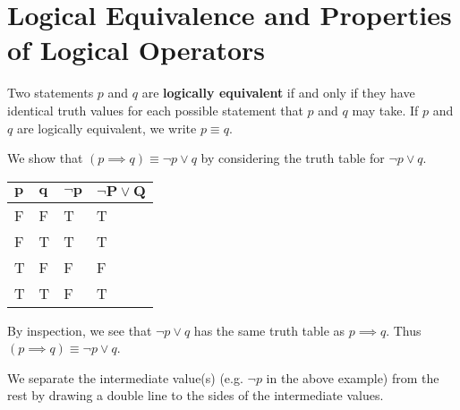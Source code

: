 \section{Logical Equivalence and Properties of Logical Operators}
\begin{definition}
    Two statements $p$ and $q$ are \textbf{logically equivalent} if and only if they have identical truth values for each possible statement that $p$ and $q$ may take. If $p$ and $q$ are logically equivalent, we write $p \equiv q$.
\end{definition}
\begin{example}\label{example-implication-law}
    We show that $(p \implies q) \equiv \lnot p \lor q$ by considering the truth table for $\lnot p \lor q$.
    \begin{table}[h]
        \centering
        \begin{tabular}{|l|l||l||l|}
            \hline
            $\boldsymbol{p}$ & $\boldsymbol{q}$ & $\boldsymbol{\lnot p}$ & $\boldsymbol{\lnot P \lor Q}$ \\ \hline
            F   & F   & T         & T                  \\ \hline
            F   & T   & T         & T                  \\ \hline
            T   & F   & F         & F                  \\ \hline
            T   & T   & F         & T                  \\ \hline
        \end{tabular}
    \end{table}

    By inspection, we see that $\lnot p \lor q$ has the same truth table as $p \implies q$. Thus $(p \implies q) \equiv \lnot p \lor q$.
\end{example}
\begin{remark}
    We separate the intermediate value(s) (e.g. $\lnot p$ in the above example) from the rest by drawing a double line to the sides of the intermediate values.
\end{remark}

\newpage

